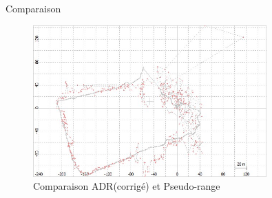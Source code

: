 \documentclass[xcolor=dvipsnames,envcountsect]{beamer}
\begin{document}
\begin{frame}{Comparaison}
	\begin{figure}
		\centering
		\includegraphics[width=0.8\textwidth]{./Figures/ADR_vs_SpeudoR.jpg}
		\caption {Comparaison ADR(corrigé) et Pseudo-range}
	\end{figure}
\end{frame}
\end{document}
